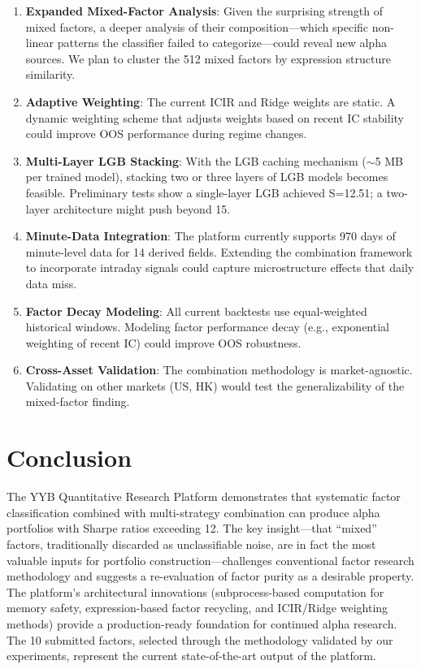 \documentclass[11pt,a4paper]{ctexart}
\begin{document}
\begin{enumerate}[nosep]
    \item \textbf{Expanded Mixed-Factor Analysis}: Given the surprising strength of mixed factors, a deeper analysis of their composition---which specific non-linear patterns the classifier failed to categorize---could reveal new alpha sources. We plan to cluster the 512 mixed factors by expression structure similarity.

    \item \textbf{Adaptive Weighting}: The current ICIR and Ridge weights are static. A dynamic weighting scheme that adjusts weights based on recent IC stability could improve OOS performance during regime changes.

    \item \textbf{Multi-Layer LGB Stacking}: With the LGB caching mechanism ($\sim$5 MB per trained model), stacking two or three layers of LGB models becomes feasible. Preliminary tests show a single-layer LGB achieved S=12.51; a two-layer architecture might push beyond 15.

    \item \textbf{Minute-Data Integration}: The platform currently supports 970 days of minute-level data for 14 derived fields. Extending the combination framework to incorporate intraday signals could capture microstructure effects that daily data miss.

    \item \textbf{Factor Decay Modeling}: All current backtests use equal-weighted historical windows. Modeling factor performance decay (e.g., exponential weighting of recent IC) could improve OOS robustness.

    \item \textbf{Cross-Asset Validation}: The combination methodology is market-agnostic. Validating on other markets (US, HK) would test the generalizability of the mixed-factor finding.
\end{enumerate}

\section{Conclusion}

The YYB Quantitative Research Platform demonstrates that systematic factor classification combined with multi-strategy combination can produce alpha portfolios with Sharpe ratios exceeding 12. The key insight---that ``mixed'' factors, traditionally discarded as unclassifiable noise, are in fact the most valuable inputs for portfolio construction---challenges conventional factor research methodology and suggests a re-evaluation of factor purity as a desirable property. The platform's architectural innovations (subprocess-based computation for memory safety, expression-based factor recycling, and ICIR/Ridge weighting methods) provide a production-ready foundation for continued alpha research. The 10 submitted factors, selected through the methodology validated by our experiments, represent the current state-of-the-art output of the platform.
\end{document}
